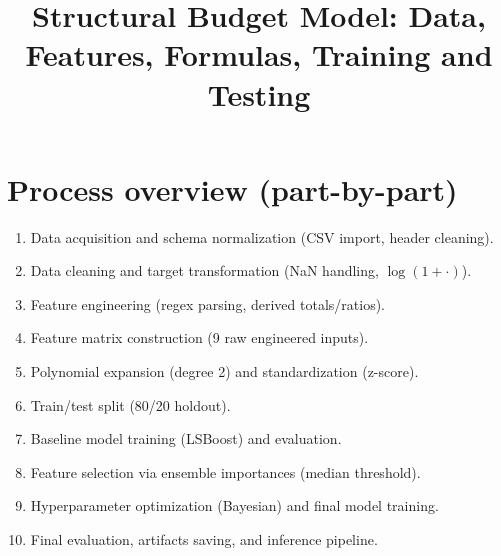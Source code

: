 \documentclass[11pt]{article}
\title{Structural Budget Model: Data, Features, Formulas, Training and Testing}
\author{}
\date{}
\begin{document}
\maketitle

\section*{Process overview (part-by-part)}
\begin{enumerate}[label=Part~\arabic*:, leftmargin=*]
  \item Data acquisition and schema normalization (CSV import, header cleaning).
  \item Data cleaning and target transformation (NaN handling, $\log(1+\cdot)$).
  \item Feature engineering (regex parsing, derived totals/ratios).
  \item Feature matrix construction (9 raw engineered inputs).
  \item Polynomial expansion (degree 2) and standardization (z-score).
  \item Train/test split (80/20 holdout).
  \item Baseline model training (LSBoost) and evaluation.
  \item Feature selection via ensemble importances (median threshold).
  \item Hyperparameter optimization (Bayesian) and final model training.
  \item Final evaluation, artifacts saving, and inference pipeline.
\end{enumerate}
\end{document}
